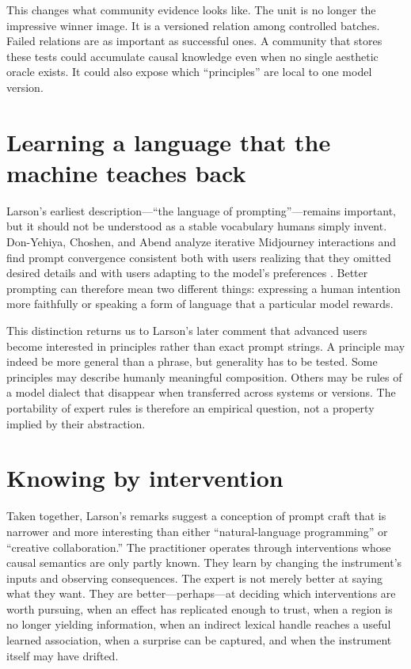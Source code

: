 \documentclass[11pt]{article}
\begin{document}
This changes what community evidence looks like. The unit is no longer the impressive winner image. It is a versioned relation among controlled batches. Failed relations are as important as successful ones. A community that stores these tests could accumulate causal knowledge even when no single aesthetic oracle exists. It could also expose which ``principles'' are local to one model version.

\section{Learning a language that the machine teaches back}
Larson’s earliest description—``the language of prompting''—remains important, but it should not be understood as a stable vocabulary humans simply invent. Don-Yehiya, Choshen, and Abend analyze iterative Midjourney interactions and find prompt convergence consistent both with users realizing that they omitted desired details and with users adapting to the model’s preferences \cite{DonYehiyaChoshenAbend2023}. Better prompting can therefore mean two different things: expressing a human intention more faithfully or speaking a form of language that a particular model rewards.

This distinction returns us to Larson’s later comment that advanced users become interested in principles rather than exact prompt strings. A principle may indeed be more general than a phrase, but generality has to be tested. Some principles may describe humanly meaningful composition. Others may be rules of a model dialect that disappear when transferred across systems or versions. The portability of expert rules is therefore an empirical question, not a property implied by their abstraction.

\section{Knowing by intervention}
Taken together, Larson’s remarks suggest a conception of prompt craft that is narrower and more interesting than either ``natural-language programming'' or ``creative collaboration.'' The practitioner operates through interventions whose causal semantics are only partly known. They learn by changing the instrument’s inputs and observing consequences. The expert is not merely better at saying what they want. They are better—perhaps—at deciding which interventions are worth pursuing, when an effect has replicated enough to trust, when a region is no longer yielding information, when an indirect lexical handle reaches a useful learned association, when a surprise can be captured, and when the instrument itself may have drifted.
\end{document}
